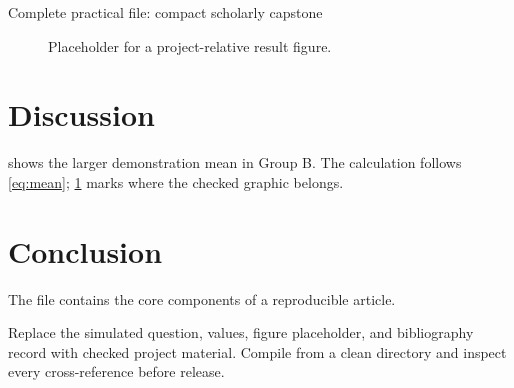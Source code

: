 \begin{latexcode}{Complete practical file: compact scholarly capstone}
\begin{figure}[htbp]
  \centering
  \fbox{\rule{0pt}{35mm}\rule{.75\linewidth}{0pt}}
  \caption{Placeholder for a project-relative result figure.}
  \label{fig:capstone}
\end{figure}

\section{Discussion}
 shows the larger demonstration mean in Group B.
The calculation follows \cref{eq:mean}; \cref{fig:capstone} marks where
the checked graphic belongs.

\section{Conclusion}
The file contains the core components of a reproducible article.

\printbibliography

\end{latexcode}

\begin{codelab}
Replace the simulated question, values, figure placeholder, and bibliography
record with checked project material. Compile from a clean directory and
inspect every cross-reference before release.
\end{codelab}
